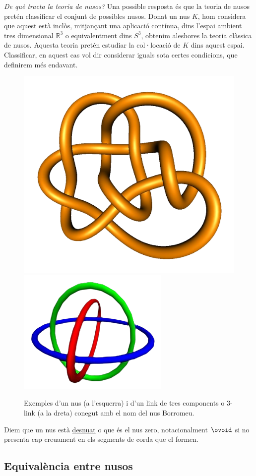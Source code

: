 \noindent
\textit{De què tracta la teoria de nusos?}
Una possible resposta és que la teoria de nusos pretén classificar el conjunt de possibles nusos. Donat un nus $K$, hom considera que aquest està inclòs, mitjançant una aplicació contínua, dins l'espai ambient tres dimensional $\mathbb{R}^3$ o equivalentment dins $S^3$, obtenim aleshores la teoria clàssica de nusos. Aquesta teoria pretén estudiar la col·locació de $K$ dins aquest espai. Classificar, en aquest cas vol dir considerar iguals sota certes condicions, que definirem més endavant.

\begin{figure}[h]
	\centering
	\includegraphics[width=0.43\linewidth]{img/knot.png}
	\includegraphics[width=0.46\linewidth]{img/boromeanrings.png}
	\caption{Exemples d'un nus (a l'esquerra) i d'un link de tres components o 3-link (a la dreta) conegut amb el nom del nus Borromeu. 
	}\label{fig:exemplesdenusosenmatematiques}
\end{figure}

\begin{definition}
	Diem que un nus està \underline{desnuat} o que és el nus zero, notacionalment $\ovoid$ si no presenta cap creuament en els segments de corda que el formen.
\end{definition}

\subsection{Equivalència entre nusos}\label{Equivalència entre nusos}

